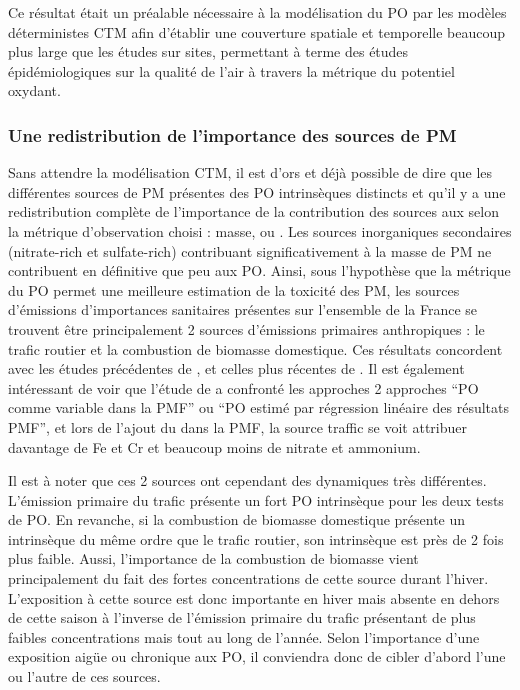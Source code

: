 Ce résultat était un préalable nécessaire à la modélisation du PO par les modèles
déterministes CTM afin d'établir une couverture spatiale et temporelle beaucoup plus
large que les études sur sites, permettant à terme des études épidémiologiques sur la
qualité de l'air à travers la métrique du potentiel oxydant.

\subsubsection{Une redistribution de l'importance des sources de PM}%
\label{ssub:une_redistribution_de_l_importance_des_sources_de_pm}

Sans attendre la modélisation CTM, il est d'ors et déjà possible de dire que les
différentes sources de PM présentes des PO intrinsèques distincts et qu'il y a une
redistribution complète de l'importance de la contribution des sources aux \PMdix{} selon
la métrique d'observation choisi : masse, \POAAv{} ou \PODTTv. Les sources inorganiques
secondaires (nitrate-rich et sulfate-rich) contribuant significativement à la masse de PM
ne contribuent en définitive que peu aux PO. Ainsi, sous l'hypothèse que
la métrique du PO permet une meilleure estimation de la toxicité des PM, les sources
d'émissions d'importances sanitaires présentes sur l'ensemble de la France se trouvent être
principalement 2 sources d'émissions primaires anthropiques : le trafic routier et la
combustion de biomasse domestique. Ces résultats concordent avec les études précédentes de
\cite{batesReactive2015,fangOxidative2016}, et celles plus récentes de
\cite{paraskevopoulouYearlong2019,cesariSource2019}. Il est également intéressant de
voir que l'étude de \cite{cesariSource2019} a confronté les approches 2 approches ``PO comme variable
dans la PMF'' ou ``PO estimé par régression linéaire des résultats PMF'', et lors
de l'ajout du \PODTTv{} dans la PMF, la source traffic se voit attribuer davantage de Fe
et Cr et beaucoup moins de nitrate et ammonium.

Il est à noter que ces 2 sources ont cependant des dynamiques très différentes. L'émission
primaire du trafic présente un fort PO intrinsèque pour les deux tests de PO.
En revanche, si la combustion de biomasse domestique présente un \POAA{} intrinsèque du
même ordre que le trafic routier, son \PODTT{} intrinsèque est près de 2 fois plus
faible. Aussi, l'importance de la combustion de biomasse vient principalement du fait des
fortes concentrations de cette source durant l'hiver. L'exposition à cette source est donc
importante en hiver mais absente en dehors de cette saison à l'inverse de l'émission
primaire du trafic présentant de plus faibles concentrations mais tout au long de l'année.
Selon l'importance d'une exposition aigüe ou chronique aux PO, il conviendra donc de
cibler d'abord l'une ou l'autre de ces sources.

